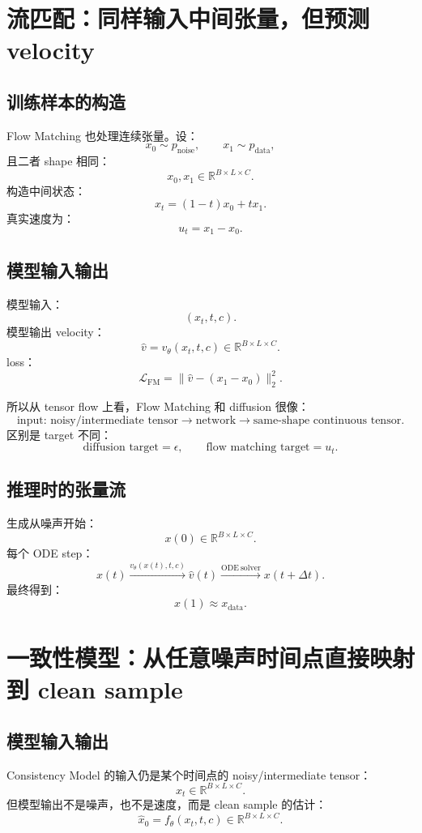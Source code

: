 \documentclass[11pt,a4paper]{ctexart}
\begin{document}
\section{流匹配：同样输入中间张量，但预测 velocity}

\subsection{训练样本的构造}

Flow Matching 也处理连续张量。设：
\[
  x_0\sim p_{\mathrm{noise}},
  \qquad
  x_1\sim p_{\mathrm{data}},
\]
且二者 shape 相同：
\[
  x_0,x_1\in\mathbb{R}^{B\times L\times C}.
\]
构造中间状态：
\[
  x_t=(1-t)x_0+t x_1.
\]
真实速度为：
\[
  u_t=x_1-x_0.
\]

\subsection{模型输入输出}

模型输入：
\[
  (x_t,t,c).
\]
模型输出 velocity：
\[
  \hat{v}
  =
  v_\theta(x_t,t,c)
  \in\mathbb{R}^{B\times L\times C}.
\]
loss：
\[
  \mathcal{L}_{\mathrm{FM}}
  =
  \|\hat{v}-(x_1-x_0)\|_2^2.
\]

所以从 tensor flow 上看，Flow Matching 和 diffusion 很像：
\[
  \text{input: noisy/intermediate tensor}
  \rightarrow
  \text{network}
  \rightarrow
  \text{same-shape continuous tensor}.
\]
区别是 target 不同：
\[
  \text{diffusion target}=\epsilon,
  \qquad
  \text{flow matching target}=u_t.
\]

\subsection{推理时的张量流}

生成从噪声开始：
\[
  x(0)\in\mathbb{R}^{B\times L\times C}.
\]
每个 ODE step：
\[
  x(t)
  \xrightarrow{v_\theta(x(t),t,c)}
  \hat{v}(t)
  \xrightarrow{\mathrm{ODE\ solver}}
  x(t+\Delta t).
\]
最终得到：
\[
  x(1)\approx x_{\mathrm{data}}.
\]

\section{一致性模型：从任意噪声时间点直接映射到 clean sample}

\subsection{模型输入输出}

Consistency Model 的输入仍是某个时间点的 noisy/intermediate tensor：
\[
  x_t\in\mathbb{R}^{B\times L\times C}.
\]
但模型输出不是噪声，也不是速度，而是 clean sample 的估计：
\[
  \hat{x}_0=f_\theta(x_t,t,c)
  \in\mathbb{R}^{B\times L\times C}.
\]
\end{document}
